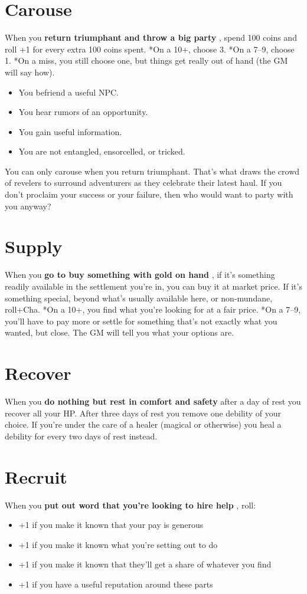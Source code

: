 \section*{Carouse}
\HRule
 When you \textbf{return triumphant and throw a big party}
, spend 100 coins and roll +1 for every extra 100 coins spent. *On a 10+, choose 3. *On a 7--9, choose 1. *On a miss, you still choose one, but things get really out of hand (the GM will say how).
\begin{itemize}
\item You befriend a useful NPC.
\item You hear rumors of an opportunity.
\item You gain useful information.
\item You are not entangled, ensorcelled, or tricked.
\end{itemize}
\HRule

 You can only carouse when you return triumphant. That's what draws the crowd of revelers to surround adventurers as they celebrate their latest haul. If you don't proclaim your success or your failure, then who would want to party with you anyway?
\section*{Supply}
\HRule
 When you \textbf{go to buy something with gold on hand}
, if it's something readily available in the settlement you're in, you can buy it at market price. If it's something special, beyond what's usually available here, or non-mundane, roll+Cha. *On a 10+, you find what you're looking for at a fair price. *On a 7--9, you'll have to pay more or settle for something that's not exactly what you wanted, but close. The GM will tell you what your options are.
\HRule
\section*{Recover}
\HRule
 When you \textbf{do nothing but rest in comfort and safety}
 after a day of rest you recover all your HP\@. After three days of rest you remove one debility of your choice. If you're under the care of a healer (magical or otherwise) you heal a debility for every two days of rest instead.
\HRule
\section*{Recruit}
\HRule
 When you \textbf{put out word that you're looking to hire help}
, roll: 
\begin{itemize}
\item +1 if you make it known that your pay is generous
\item +1 if you make it known what you're setting out to do
\item +1 if you make it known that they'll get a share of whatever you find
\item +1 if you have a useful reputation around these parts
\end{itemize}
\HRule

